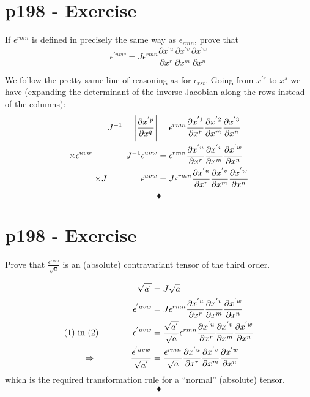 \section{p198 - Exercise}
\begin{tcolorbox}
If $\epsilon^{rmn}$ is defined in precisely the same way as $\epsilon_{rmn}$, prove that $$ \epsilon^{'uvw}= J\epsilon^{rmn}\frac{\partial x^{'u}}{\partial x^r}\frac{\partial x^{'v}}{\partial x^m}\frac{\partial x^{'w}}{\partial x^n}$$
\end{tcolorbox}
We follow the pretty same line of reasoning as for $\epsilon_{rst}$. Going from $x^{'r}$ to $x^{s}$ we have (expanding the determinant of the inverse Jacobian along the rows instead of the columns):
\begin{align}
J^{-1}=\left|\frac{\partial x^{'p}}{\partial x^{q}}\right|&= \epsilon^{rmn}\frac{\partial x^{'1}}{\partial x^r}\frac{\partial x^{'2}}{\partial x^m}\frac{\partial x^{'3}}{\partial x^n}\\
\times \epsilon^{uvw}\quad\quad\quad\quad J^{-1}\epsilon^{uvw}&= \epsilon^{rmn}\frac{\partial x^{'u}}{\partial x^r}\frac{\partial x^{'v}}{\partial x^m}\frac{\partial x^{'w}}{\partial x^n}\\
\times J\quad\quad\quad\quad\epsilon^{uvw}&= J\epsilon^{rmn}\frac{\partial x^{'u}}{\partial x^r}\frac{\partial x^{'v}}{\partial x^m}\frac{\partial x^{'w}}{\partial x^n}\\ 
\end{align}
 $$\blacklozenge$$
\newpage



\section{p198 - Exercise}
\begin{tcolorbox}
Prove that  $\frac{\epsilon^{rmn}}{\sqrt{a}}$ is an (absolute) contravariant tensor of the third order.
\end{tcolorbox}
\begin{align} 
\sqrt{a^{'}} &= J\sqrt{a}\\
\epsilon^{'uvw}&= J\epsilon^{rmn}\frac{\partial x^{'u}}{\partial x^r}\frac{\partial x^{'v}}{\partial x^m}\frac{\partial x^{'w}}{\partial x^n}\\
\text{(1)  in (2)} \quad\quad\quad\quad \epsilon^{'uvw}&= \frac{\sqrt{a^{'}}}{\sqrt{a^{}}}\epsilon^{rmn}\frac{\partial x^{'u}}{\partial x^r}\frac{\partial x^{'v}}{\partial x^m}\frac{\partial x^{'w}}{\partial x^n}\\
\Rightarrow \quad\quad\quad\quad \frac{\epsilon^{'uvw}}{\sqrt{a^{'}}}&= \frac{\epsilon^{rmn}}{\sqrt{a}}\frac{\partial x^{'u}}{\partial x^r}\frac{\partial x^{'v}}{\partial x^m}\frac{\partial x^{'w}}{\partial x^n}
\end{align}
which is the required transformation rule for a ``normal'' (absolute) tensor.
 $$\blacklozenge$$
\newpage


